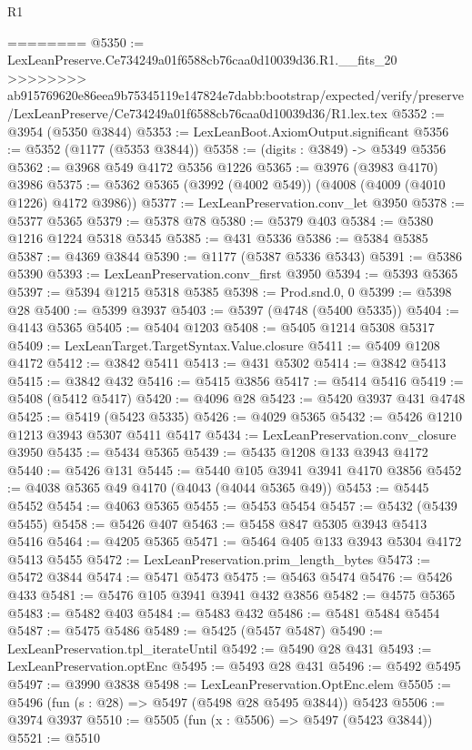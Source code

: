 \begin{lexlean}{R1}
\begin{coremodule}
{{{{{{{{{{{{{{{{{{{{{{{{{{{{{{{{{{{{{{{{{{{{{{{{{{{{{{{{{{{{{{{{{{{{{{{{{{{{{{{{{{{{{{{{{{{{{{{{{{{{{{{{{{{{{{{{{{{{{{{{{{{{{{{{{{{{{{{{{{{{{{{{{{{{{{{{{{{{{{{{{{{{{{{{{{{{{{{{{{{{{{{{{{========
@5350 := LexLeanPreserve.Ce734249a01f6588cb76caa0d10039d36.R1.__fits_20
>>>>>>>> ab915769620e86eea9b75345119e147824e7dabb:bootstrap/expected/verify/preserve/LexLeanPreserve/Ce734249a01f6588cb76caa0d10039d36/R1.lex.tex
@5352 := @3954 (@5350 @3844)
@5353 := LexLeanBoot.AxiomOutput.significant
@5356 := @5352 (@1177 (@5353 @3844))
@5358 := (digits : @3849) -> @5349 @5356
@5362 := @3968 @549 @4172 @5356 @1226
@5365 := @3976 (@3983 @4170) @3986
@5375 := @5362 @5365 (@3992 (@4002 @549)) (@4008 (@4009 (@4010 @1226) @4172 @3986))
@5377 := LexLeanPreservation.conv_let @3950
@5378 := @5377 @5365
@5379 := @5378 @78
@5380 := @5379 @403
@5384 := @5380 @1216 @1224 @5318 @5345
@5385 := @431 @5336
@5386 := @5384 @5385
@5387 := @4369 @3844
@5390 := @1177 (@5387 @5336 @5343)
@5391 := @5386 @5390
@5393 := LexLeanPreservation.conv_first @3950
@5394 := @5393 @5365
@5397 := @5394 @1215 @5318 @5385
@5398 := Prod.snd.{0, 0}
@5399 := @5398 @28
@5400 := @5399 @3937
@5403 := @5397 (@4748 (@5400 @5335))
@5404 := @4143 @5365
@5405 := @5404 @1203
@5408 := @5405 @1214 @5308 @5317
@5409 := LexLeanTarget.TargetSyntax.Value.closure
@5411 := @5409 @1208 @4172
@5412 := @3842 @5411
@5413 := @431 @5302
@5414 := @3842 @5413
@5415 := @3842 @432
@5416 := @5415 @3856
@5417 := @5414 @5416
@5419 := @5408 (@5412 @5417)
@5420 := @4096 @28
@5423 := @5420 @3937 @431 @4748
@5425 := @5419 (@5423 @5335)
@5426 := @4029 @5365
@5432 := @5426 @1210 @1213 @3943 @5307 @5411 @5417
@5434 := LexLeanPreservation.conv_closure @3950
@5435 := @5434 @5365
@5439 := @5435 @1208 @133 @3943 @4172
@5440 := @5426 @131
@5445 := @5440 @105 @3941 @3941 @4170 @3856
@5452 := @4038 @5365 @49 @4170 (@4043 (@4044 @5365 @49))
@5453 := @5445 @5452
@5454 := @4063 @5365
@5455 := @5453 @5454
@5457 := @5432 (@5439 @5455)
@5458 := @5426 @407
@5463 := @5458 @847 @5305 @3943 @5413 @5416
@5464 := @4205 @5365
@5471 := @5464 @405 @133 @3943 @5304 @4172 @5413 @5455
@5472 := LexLeanPreservation.prim_length_bytes
@5473 := @5472 @3844
@5474 := @5471 @5473
@5475 := @5463 @5474
@5476 := @5426 @433
@5481 := @5476 @105 @3941 @3941 @432 @3856
@5482 := @4575 @5365
@5483 := @5482 @403
@5484 := @5483 @432
@5486 := @5481 @5484 @5454
@5487 := @5475 @5486
@5489 := @5425 (@5457 @5487)
@5490 := LexLeanPreservation.tpl_iterateUntil
@5492 := @5490 @28 @431
@5493 := LexLeanPreservation.optEnc
@5495 := @5493 @28 @431
@5496 := @5492 @5495
@5497 := @3990 @3838
@5498 := LexLeanPreservation.OptEnc.elem
@5505 := @5496 (fun (s : @28) => @5497 (@5498 @28 @5495 @3844)) @5423
@5506 := @3974 @3937
@5510 := @5505 (fun (x : @5506) => @5497 (@5423 @3844))
@5521 := @5510
}}}}}}}}}}}}}}}}}}}}}}}}}}}}}}}}}}}}}}}}}}}}}}}}}}}}}}}}}}}}}}}}}}}}}}}}}}}}}}}}}}}}}}}}}}}}}}}}}}}}}}}}}}}}}}}}}}}}}}}}}}}}}}}}}}}}}}}}}}}}}}}}}}}}}}}}}}}}}}}}}}}}}}}}}}}}}}}}}}}}}}}}}}
\end{coremodule}
\end{lexlean}
